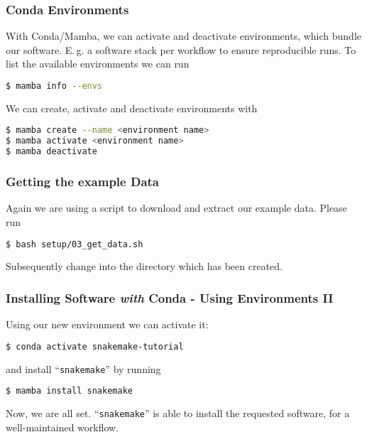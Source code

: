 \begin{frame}[fragile]
  \frametitle{Conda Environments}
  With Conda/Mamba, we can activate and deactivate environments, which bundle our software. E.\,g. a software stack per workflow to ensure reproducible runs.
    \pause
  To list the available environments we can run
  \begin{lstlisting}[language=Bash, style=Shell]
$ mamba info --envs
  \end{lstlisting}
  We can create, activate and deactivate environments with
  \begin{lstlisting}[language=Bash, style=Shell]
$ mamba create --name <environment name>
$ mamba activate <environment name>
$ mamba deactivate
  \end{lstlisting}
\end{frame}

\begin{frame}[fragile]
  \frametitle{Getting the example Data}
  Again we are using a script to download and extract our example data. Please run
  \begin{lstlisting}[language=Bash, style=Shell]
$ bash setup/03_get_data.sh
  \end{lstlisting}
  Subsequently change into the directory  which has been created. 
  \pause
\end{frame}


\begin{frame}[fragile]
  \frametitle{Installing Software \emph{with} Conda - Using Environments II}
  Using our new environment we can activate it:
  \begin{lstlisting}[language=Bash, style=Shell]
$ conda activate snakemake-tutorial
  \end{lstlisting}
  and install ``\texttt{snakemake}'' by running
  \begin{lstlisting}[language=Bash, style=Shell]
$ mamba install snakemake
  \end{lstlisting}
  Now, we are all set. ``\texttt{snakemake}'' is able to install the requested software, for a well-maintained workflow.
\end{frame}
